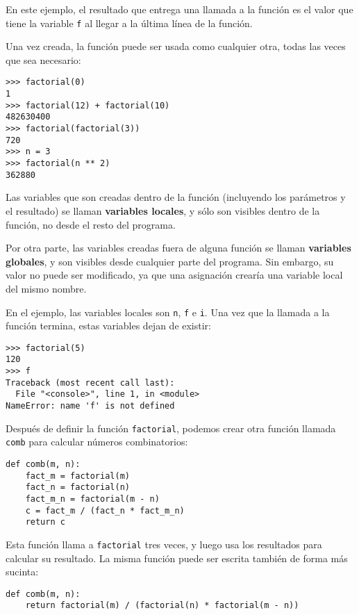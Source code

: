 En este ejemplo, el resultado que entrega una llamada a la función es el
valor que tiene la variable \lstinline!f! al llegar a la última línea de
la función.

Una vez creada, la función puede ser usada como cualquier otra, todas
las veces que sea necesario:

\begin{lstlisting}
>>> factorial(0)
1
>>> factorial(12) + factorial(10)
482630400
>>> factorial(factorial(3))
720
>>> n = 3
>>> factorial(n ** 2)
362880
\end{lstlisting}

Las variables que son creadas dentro de la función (incluyendo los
pará\-me\-tros y el resultado) se llaman \textbf{variables locales}, y sólo
son visibles dentro de la función, no desde el resto del programa.

Por otra parte, las variables creadas fuera de alguna función se llaman
\textbf{variables globales}, y son visibles desde cualquier parte del
programa. Sin embargo, su valor no puede ser modificado, ya que una
asignación crearía una variable local del mismo nombre.

En el ejemplo, las variables locales son \lstinline!n!, \lstinline!f! e
\lstinline!i!. Una vez que la llamada a la función termina, estas
variables dejan de existir:

\begin{lstlisting}
>>> factorial(5)
120
>>> f
Traceback (most recent call last):
  File "<console>", line 1, in <module>
NameError: name 'f' is not defined
\end{lstlisting}

Después de definir la función \lstinline!factorial!, podemos crear otra
función llamada \lstinline!comb! para calcular números combinatorios:

\begin{lstlisting}
def comb(m, n):
    fact_m = factorial(m)
    fact_n = factorial(n)
    fact_m_n = factorial(m - n)
    c = fact_m / (fact_n * fact_m_n)
    return c
\end{lstlisting}

Esta función llama a \lstinline!factorial! tres veces, y luego usa los
resultados para calcular su resultado. La misma función puede ser
escrita también de forma más sucinta:

\begin{lstlisting}
def comb(m, n):
    return factorial(m) / (factorial(n) * factorial(m - n))
\end{lstlisting}


